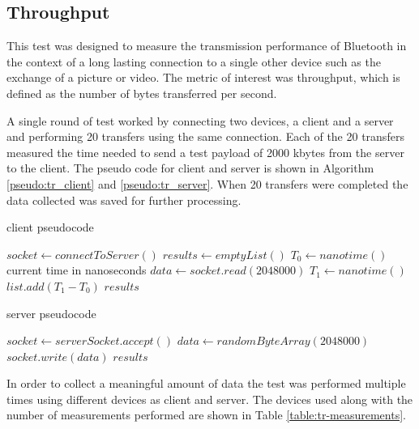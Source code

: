 \subsection{Throughput}
This test was designed to measure the transmission performance of Bluetooth in the context of a long lasting connection to a single other device such as the exchange of a picture or video.
The metric of interest was throughput, which is defined as the number of bytes transferred per second.

A single round of test worked by connecting two devices, a client and a server and performing 20 transfers using the same connection.
Each of the 20 transfers measured the time needed to send a test payload of 2000 kbytes from the server to the client.
The pseudo code for client and server is shown in Algorithm \ref{pseudo:tr_client} and \ref{pseudo:tr_server}.
When 20 transfers were completed the data collected was saved for further processing.

\begin{algorithm}
	\begin{algorithmic}[1]
  		\caption{client pseudocode}
  		\label{pseudo:tr_client}
		\State $socket \leftarrow connectToServer()$
		\State $results \leftarrow emptyList()$
		    \State $T_0 \leftarrow nanotime()$ \Comment current time in nanoseconds
			\State $data \leftarrow socket.read(2048000)$ 
			\State $T_1 \leftarrow nanotime()$
			\State $list.add(T_1 - T_0)$
		\EndFor
		\State \Return $results$
  	\end{algorithmic}
\end{algorithm}

\begin{algorithm}
	\begin{algorithmic}[1]
  		\caption{server pseudocode}
  		\label{pseudo:tr_server}
  		\State $socket \leftarrow serverSocket.accept()$
		\Repeat
		    \State $data \leftarrow randomByteArray(2048000)$
            \State $socket.write(data)$
		\State \Return $results$
  	\end{algorithmic}
\end{algorithm}

In order to collect a meaningful amount of data the test was performed multiple times using different devices as client and server.
The devices used along with the number of measurements performed are shown in Table \ref{table:tr-measurements}.

